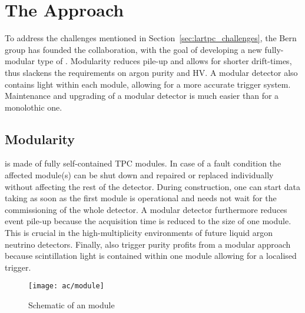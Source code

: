 \section{The \AC{} Approach}
\label{sec:ac_argoncube}


To address the challenges mentioned in Section~\ref{sec:lartpc_challenges}, the Bern group has founded the \AC{} collaboration, with the goal of developing a new fully-modular type of \lartpc{}.
Modularity reduces pile-up and allows for shorter drift-times, thus slackens the requirements on argon purity and HV.
A modular detector also contains light within each module, allowing for a more accurate trigger system.
Maintenance and upgrading of a modular detector is much easier than for a monolothic one.


\subsection*{Modularity}

\AC{} is made of fully self-contained TPC modules.
In case of a fault condition the affected module(s) can be shut down and repaired or replaced individually without affecting the rest of the detector.
During construction, one can start data taking as soon as the first module is operational and needs not wait for the commissioning of the whole detector.
A modular detector furthermore reduces event pile-up because the acquisition time is reduced to the size of one module.
This is crucial in the high-multiplicity environments of future liquid argon neutrino detectors.
Finally, also trigger purity profits from a modular approach because scintillation light is contained within one module allowing for a localised trigger.

\begin{figure}[htb]
	\centering
	\texttt{[image: ac/module]}
	\caption{Schematic of an \AC{} module}
	\label{fig:ac_module}
\end{figure}

